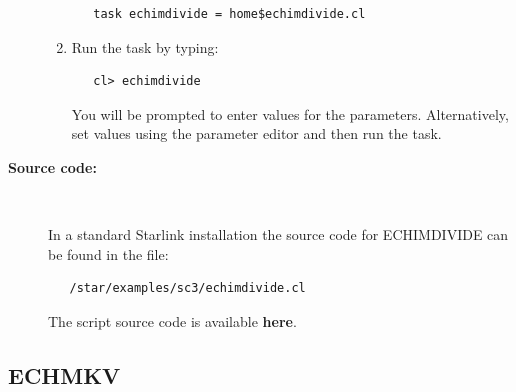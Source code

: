 \documentclass[twoside,11pt]{article}
\newcommand{\htmlref}[2]{#1}
\newcommand{\xlabel}[1]{}
\begin{document}
\begin{description}
\begin{enumerate}
\begin{verbatim}
   task echimdivide = home$echimdivide.cl
\end{verbatim}

\item Run the task by typing:

\begin{verbatim}
   cl> echimdivide
\end{verbatim}

      You will be prompted
      to enter values for the parameters. Alternatively, set values
      using the parameter editor and then run the task.
\end{enumerate}

\item [{\bf Source code:}] \mbox{} \\
\begin{latex}
In a standard Starlink installation the source code for ECHIMDIVIDE can be
found in the file:
\begin{verbatim}
   /star/examples/sc3/echimdivide.cl
\end{verbatim}
\end{latex}
\begin{htmlonly}
      The script source code is available
      \htmlref{{\bf here}}{se_echimdivide_source}.
\end{htmlonly}

\end{description}

\newpage
\subsection{\label{se_echmkv}\xlabel{ECHMKV}ECHMKV}
\end{document}
